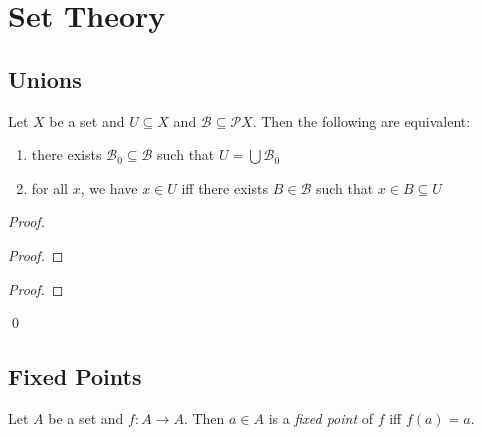 \newcommand{\finsubseteq}{\ensuremath{\subseteq^{\mathrm{fin}}}}

\chapter{Set Theory}

\section{Unions}

\begin{prop}
  \label{prop:set_theory:unions}
  Let $X$ be a set and $U \subseteq X$ and $\mathcal{B} \subseteq \mathcal{P} X$. Then the following are equivalent:
  \begin{enumerate}
    \item there exists $\mathcal{B}_0 \subseteq \mathcal{B}$ such that $U = \bigcup \mathcal{B}_0$
    \item for all $x$, we have $x \in U$ iff there exists $B \in \mathcal{B}$ such that $x \in B \subseteq U$
  \end{enumerate}
\end{prop}

\begin{proof}
  \pf
  \begin{proof}
  \end{proof}
  \begin{proof}
  \end{proof}
  \qed
\end{proof}

\section{Fixed Points}

\begin{df}
  Let $A$ be a set and $f : A \rightarrow A$. Then $a \in A$ is a \emph{fixed point} of $f$ iff $f(a) = a$.
\end{df}

